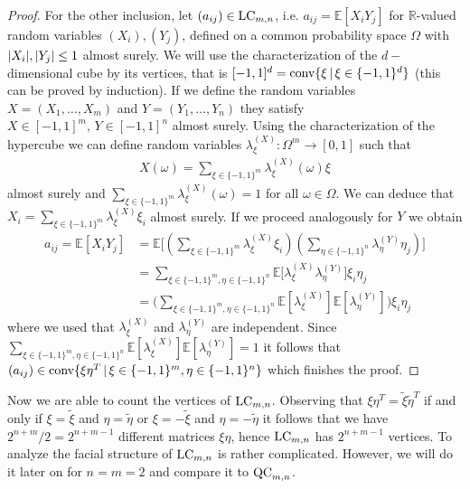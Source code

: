 \begin{proof}
	For the other inclusion, let $ (a_{ij}) \in \textup{LC}_{m,n} $, i.e. $ a_{ij} = \mathbb{E}[X_iY_j] $ for $ \mathbb{R} $-valued random variables $ (X_i),(Y_j) $, defined on a common probability space $ \Omega $ with $ {\left|{X_i}\right|},{\left|{Y_j}\right|} \le 1 $ almost surely. 
	We will use the characterization of the $ d-$dimensional cube by its vertices, that is $ [-1,1]^d = \textup{conv} \{\xi \, | \, \xi \in \{-1,1 \}^d \}$ (this can be proved by induction). 
	If we define the random variables $ X= (X_1,\hdots,X_m) $ and $ Y= (Y_1,\hdots,Y_n) $ they satisfy $ X \in [-1,1]^m, \, Y \in [-1,1]^n $ almost surely. Using the characterization of the hypercube we can define random variables $ \lambda_{\xi}^{(X)}: \Omega^m \to [0,1] $ such that 
	\begin{align*}
		X(\omega) = \sum_{\xi \in \{-1,1\}^m}\lambda_{\xi}^{(X)}(\omega)\xi
	\end{align*} 
	almost surely 
	and $ \sum_{\xi \in \{-1,1\}^m}\lambda_{\xi}^{(X)}(\omega) = 1  $ for all $ \omega \in \Omega $. We can deduce that 
	$X_i =  \sum_{\xi \in \{-1,1\}^m}\lambda_{\xi}^{(X)}\xi_i $ almost surely.
	If we proceed analogously for $ Y $ we obtain
	\begin{align*}
		a_{ij} = \mathbb{E}[X_iY_j] &= \mathbb{E} \big [  (\sum_{\xi \in \{-1,1\}^m}\lambda_{\xi}^{(X)}\xi_i ) (\sum_{\eta \in \{-1,1\}^n}\lambda_{\eta}^{(Y)}\eta_j ) \big ]   \\
		&= \sum_{\xi \in \{-1,1\}^m, \eta \in \{-1,1\}^n} \mathbb{E}\big [\lambda_{\xi}^{(X)}\lambda_{\eta}^{(Y)} \big ] \xi_i \eta_j  \\
		&= \big (\sum_{\xi \in \{-1,1\}^m, \eta \in \{-1,1\}^n}\mathbb{E} [\lambda_{\xi}^{(X)} ]\mathbb{E}[\lambda_{\eta}^{(Y)}]\big )\xi_i\eta_j
	\end{align*}
	where we used that $ \lambda_{\xi}^{(X)} $ and $ \lambda_{\eta}^{(Y)} $ are independent.
	Since $
		\sum_{\xi \in \{-1,1\}^m, \eta \in \{-1,1\}^n}\mathbb{E} [\lambda_{\xi}^{(X)} ]\mathbb{E}[\lambda_{\eta}^{(Y)}] = 1 $ it follows that $ (a_{ij}) \in  \textup{conv} \{  \xi\eta^T \, | \, \xi \in \{-1,1\}^m, \eta \in \{-1,1\}^n     \}$
 which finishes the proof.
\end{proof}
Now we are able to count the vertices of $ \textup{LC}_{m,n} $. Observing that $ \xi \eta^T = \tilde{\xi} \tilde{\eta}^T $ if and only if $ \xi = \tilde{\xi} $ and $ \eta = \tilde{\eta} $ or $ \xi = -\tilde{\xi} $ and $ \eta = -\tilde{\eta} $ it follows that we have $ 2^{n+m}/2 = 2^{n+m-1} $ different matrices $ \xi \eta $, hence $ \textup{LC}_{m,n} $ has $ 2^{n+m-1} $ vertices. To analyze the facial structure of $ \textup{LC}_{m,n} $ is rather complicated. 
However, we will do it later on for $ n=m=2 $ and compare it to $ \textup{QC}_{m,n} $.

